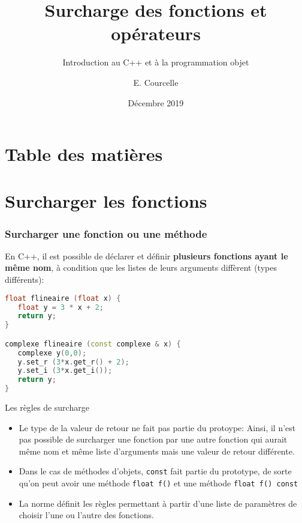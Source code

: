 \documentclass{beamer}
\title{Surcharge des fonctions et opérateurs}
\subtitle{Introduction au C++ et à la programmation objet}
\author{E. Courcelle}\institute{CALMIP, URA 3667}
\date{Décembre 2019}
\begin{document}
\begin{frame}
\titlepage
\end{frame}

\section*{Table des matières}
\begin{frame}
\tableofcontents
\end{frame}


\section{Surcharger les fonctions}

\begin{frame}[fragile=singleslide,shrink=20]
\frametitle {Surcharger une fonction ou une méthode}

En C++, il est possible de déclarer et définir \textbf{plusieurs fonctions ayant le même nom}, à condition que les listes de leurs arguments diffèrent (types différents):

\begin{lstlisting}[language=c++]
float flineaire (float x) {                   
   float y = 3 * x + 2;
   return y;
}

complexe flineaire (const complexe & x) {
   complexe y(0,0);
   y.set_r (3*x.get_r() + 2);
   y.set_i (3*x.get_i());
   return y;
}
\end{lstlisting}

\begin{block}{Les règles de surcharge}
\begin{itemize}
\item{Le type de la valeur de retour ne fait pas partie du protoype: Ainsi, il n'est pas possible de surcharger une fonction par une autre fonction qui aurait même nom et même liste d'arguments mais une valeur de retour différente.}
\item{Dans le cas de méthodes d'objets, \texttt{const} fait partie du prototype, de sorte qu'on peut avoir une méthode \texttt{float f()} et une méthode \texttt{float f() const} }
\item{La norme définit les règles permettant à partir d'une liste de paramètres de choisir l'une ou l'autre des fonctions.}
\end{itemize}
\end{block}
\end{frame}
\end{document}
